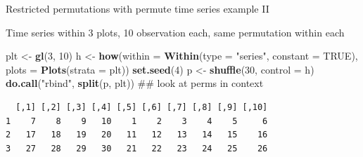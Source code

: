 \documentclass[10pt,ignorenonframetext,compress, aspectratio=169]{beamer}
\newenvironment{Shaded}{\begin{snugshade}}{\end{snugshade}}
\newcommand{\KeywordTok}[1]{\textcolor[rgb]{0.13,0.29,0.53}{\textbf{{#1}}}}
\newcommand{\DataTypeTok}[1]{\textcolor[rgb]{0.13,0.29,0.53}{{#1}}}
\newcommand{\DecValTok}[1]{\textcolor[rgb]{0.00,0.00,0.81}{{#1}}}
\newcommand{\StringTok}[1]{\textcolor[rgb]{0.31,0.60,0.02}{{#1}}}
\newcommand{\OtherTok}[1]{\textcolor[rgb]{0.56,0.35,0.01}{{#1}}}
\newcommand{\NormalTok}[1]{{#1}}
\begin{document}
\begin{frame}[fragile]{Restricted permutations with permute \textbar{}
time series example II}

Time series within 3 plots, 10 observation each, same permutation within
each

\scriptsize

\begin{Shaded}
\begin{Highlighting}[]
\NormalTok{plt <-}\StringTok{ }\KeywordTok{gl}\NormalTok{(}\DecValTok{3}\NormalTok{, }\DecValTok{10}\NormalTok{)}
\NormalTok{h <-}\StringTok{ }\KeywordTok{how}\NormalTok{(}\DataTypeTok{within =} \KeywordTok{Within}\NormalTok{(}\DataTypeTok{type =} \StringTok{"series"}\NormalTok{, }\DataTypeTok{constant =} \OtherTok{TRUE}\NormalTok{), }\DataTypeTok{plots =} \KeywordTok{Plots}\NormalTok{(}\DataTypeTok{strata =} \NormalTok{plt))}
\KeywordTok{set.seed}\NormalTok{(}\DecValTok{4}\NormalTok{)}
\NormalTok{p <-}\StringTok{ }\KeywordTok{shuffle}\NormalTok{(}\DecValTok{30}\NormalTok{, }\DataTypeTok{control =} \NormalTok{h)}
\KeywordTok{do.call}\NormalTok{(}\StringTok{"rbind"}\NormalTok{, }\KeywordTok{split}\NormalTok{(p, plt)) ## look at perms in context}
\end{Highlighting}
\end{Shaded}

\begin{verbatim}
  [,1] [,2] [,3] [,4] [,5] [,6] [,7] [,8] [,9] [,10]
1    7    8    9   10    1    2    3    4    5     6
2   17   18   19   20   11   12   13   14   15    16
3   27   28   29   30   21   22   23   24   25    26
\end{verbatim}

\normalsize

\end{frame}
\end{document}
